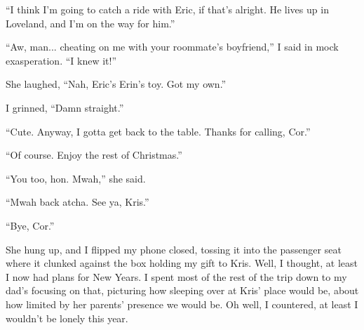 ``I think I'm going to catch a ride with Eric, if that's alright.  He lives up in Loveland, and I'm on the way for him.''

``Aw, man... cheating on me with your roommate's boyfriend,'' I said in mock exasperation.  ``I knew it!''

She laughed, ``Nah, Eric's Erin's toy.  Got my own.''

I grinned, ``Damn straight.''

``Cute.  Anyway, I gotta get back to the table.  Thanks for calling, Cor.''

``Of course.  Enjoy the rest of Christmas.''

``You too, hon.  Mwah,'' she said.

``Mwah back atcha.  See ya, Kris.''

``Bye, Cor.''

She hung up, and I flipped my phone closed, tossing it into the passenger seat where it clunked against the box holding my gift to Kris.  Well, I thought, at least I now had plans for New Years.  I spent most of the rest of the trip down to my dad's focusing on that, picturing how sleeping over at Kris' place would be, about how limited by her parents' presence we would be.  Oh well, I countered, at least I wouldn't be lonely this year.
